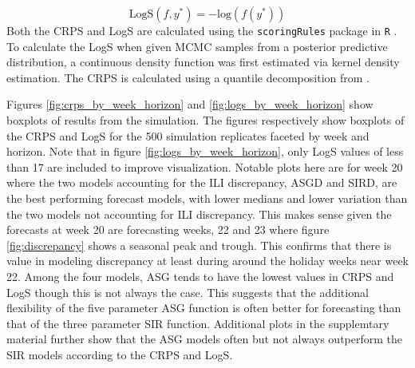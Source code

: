 \documentclass[ba]{imsart}
\theoremstyle{plain}
\theoremstyle{definition}
\theoremstyle{remark}
\begin{document}
\begin{equation}
    \text{LogS}(f, y^*) = -\text{log}(f(y^*))
    \label{eq:logs2}
\end{equation}
Both the CRPS and LogS are calculated using the \texttt{scoringRules} package in \texttt{R} \cite[]{jordan2019scoring}.
To calculate the LogS when given MCMC samples from a posterior predictive distribution, a continuous density function was first estimated via kernel density estimation. The CRPS is calculated using a quantile decomposition from \cite[]{laio2007verification}. 






Figures \ref{fig:crps_by_week_horizon} and \ref{fig:logs_by_week_horizon} show 
boxplots of results from the simulation. The figures respectively
show boxplots of the CRPS and LogS for the 500 simulation replicates faceted by week and horizon. Note that in figure \ref{fig:logs_by_week_horizon}, only LogS values of less than 17 are included to improve visualization.
Notable plots here are for week 20 where the two models accounting for the ILI discrepancy, ASGD and SIRD, are the best performing forecast models, with lower medians and lower variation than the two models not accounting for ILI discrepancy. This makes sense given the forecasts at week 20 are forecasting weeks, 22 and 23 where figure \ref{fig:discrepancy} shows a seasonal peak and trough. This confirms that there is value in modeling discrepancy at least during around the holiday weeks near week 22. Among the four models, ASG tends to have the lowest values in CRPS and LogS though this is not always the case. This suggests that the additional flexibility of the five parameter ASG function is often better for forecasting than that of the three parameter SIR function. Additional
plots in the supplemtary material \cite[]{wadsworth2024bas} further show that the ASG models often but not always outperform the SIR models according to the CRPS and LogS.
\end{document}
